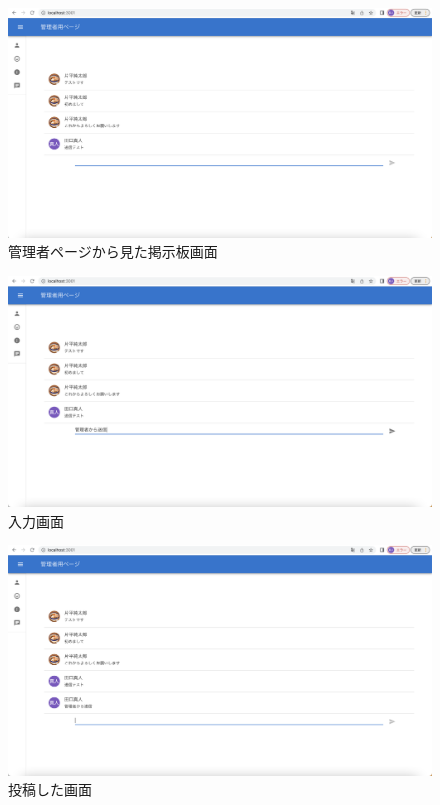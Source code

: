 \vspace{30mm}

\begin{figure}[!h]
  \begin{center}
    \includegraphics[scale=0.3, clip]{./img/sample16.png}
    \caption{管理者ページから見た掲示板画面}
    \label{fig:図の名前}
  \end{center}
  \end{figure}

  \begin{figure}[!h]
    \begin{center}
      \includegraphics[scale=0.3, clip]{./img/sample17.png}
      \caption{入力画面}
      \label{fig:図の名前}
    \end{center}
    \end{figure}

    \begin{figure}[!h]
      \begin{center}
        \includegraphics[scale=0.3, clip]{./img/sample18.png}
        \caption{投稿した画面}
        \label{fig:図の名前}
      \end{center}
      \end{figure}

